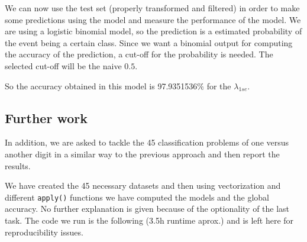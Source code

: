 \documentclass[
  10pt,
]{article}
\newenvironment{Shaded}{\begin{snugshade}}{\end{snugshade}}
\newcommand{\AttributeTok}[1]{\textcolor[rgb]{0.13,0.29,0.53}{#1}}
\newcommand{\CommentTok}[1]{\textcolor[rgb]{0.56,0.35,0.01}{\textit{#1}}}
\newcommand{\DecValTok}[1]{\textcolor[rgb]{0.00,0.00,0.81}{#1}}
\newcommand{\FloatTok}[1]{\textcolor[rgb]{0.00,0.00,0.81}{#1}}
\newcommand{\FunctionTok}[1]{\textcolor[rgb]{0.13,0.29,0.53}{\textbf{#1}}}
\newcommand{\NormalTok}[1]{#1}
\newcommand{\OtherTok}[1]{\textcolor[rgb]{0.56,0.35,0.01}{#1}}
\newcommand{\SpecialCharTok}[1]{\textcolor[rgb]{0.81,0.36,0.00}{\textbf{#1}}}
\newcommand{\StringTok}[1]{\textcolor[rgb]{0.31,0.60,0.02}{#1}}
\begin{document}
We can now use the test set (properly transformed and filtered) in order
to make some predictions using the model and measure the performance of
the model. We are using a logistic binomial model, so the prediction is
a estimated probability of the event being a certain class. Since we
want a binomial output for computing the accuracy of the prediction, a
cut-off for the probability is needed. The selected cut-off will be the
naive \(0.5\).

\begin{Shaded}
\end{Shaded}

So the accuracy obtained in this model is 97.9351536\(\%\) for the
\(\lambda_{1se}\).

\hypertarget{further-work}{%
\subsection{Further work}\label{further-work}}

In addition, we are asked to tackle the 45 classification problems of
one versus another digit in a similar way to the previous approach and
then report the results.

We have created the 45 necessary datasets and then using vectorization
and different \texttt{apply()} functions we have computed the models and
the global accuracy. No further explanation is given because of the
optionality of the last task. The code we run is the following (3.5h
runtime aprox.) and is left here for reproducibility issues.
\end{document}

